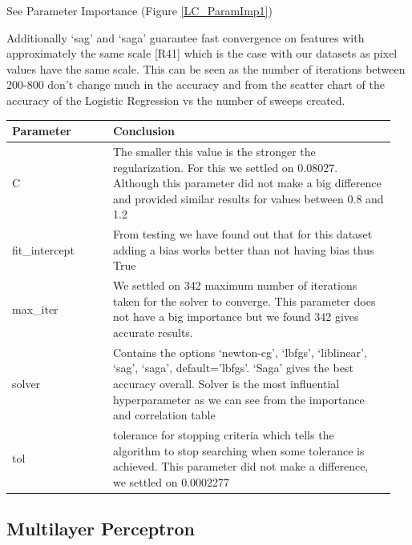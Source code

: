 \documentclass[11pt]{article}
\begin{document}
See Parameter Importance (Figure \ref{LC_ParamImp1})

Additionally ‘sag’ and ‘saga’ guarantee fast convergence on features with approximately the same scale [R41] which is the case with our datasets as pixel values have the same scale. This can be seen as the number of iterations between 200-800 don’t change much in the accuracy and from the scatter chart of the accuracy of the Logistic Regression vs the number of sweeps created.

\begin{table}[ht]
  \centering
  \begin{tabular}{|p{0.25\linewidth} | p{0.7\linewidth}|} 
    \hline
    \textbf{Parameter}  & \textbf{Conclusion} \\ \hline
    C & The smaller this value is the stronger the regularization. For this we settled on 0.08027. Although this parameter did not make a big difference and provided similar results for values between 0.8 and 1.2 \\ \hline
    fit\_intercept & From testing we have found out that for this dataset adding a bias works better than not having bias thus True  \\ \hline
    max\_iter & We settled on 342 maximum number of iterations taken for the solver to converge. This parameter does not have a big importance but we found 342 gives accurate results. \\ \hline
    solver & Contains the options ‘newton-cg’, ‘lbfgs’, ‘liblinear’, ‘sag’, ‘saga’, default=’lbfgs’. ‘Saga’ gives the best accuracy overall. Solver is the most influential hyperparameter as we can see from the importance and correlation table \\ \hline
    tol & tolerance for stopping criteria which tells the algorithm to stop searching when some tolerance is achieved. This parameter did not make a difference, we settled on 0.0002277 \\ \hline


  \end{tabular}
\end{table}\label{RF_Analysis_Table}

\newpage
\subsection{Multilayer Perceptron}
\end{document}
